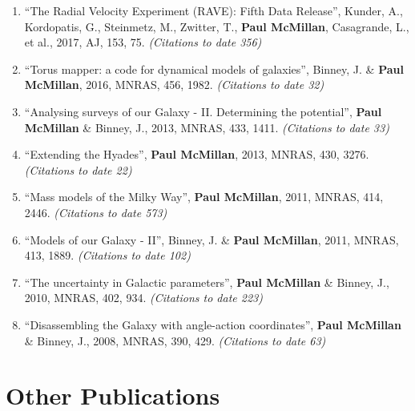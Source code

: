 \documentclass{resume}
\begin{document}
\begin{enumerate}
\item ``The Radial Velocity Experiment (RAVE): Fifth Data Release'', Kunder, A., Kordopatis, G., Steinmetz, M., Zwitter, T., \textbf{Paul McMillan}, Casagrande, L., et al., 2017, AJ, 153, 75. \textit{(Citations to date 356)}

\item ``Torus mapper: a code for dynamical models of galaxies'', Binney, J. \& \textbf{Paul McMillan}, 2016, MNRAS, 456, 1982. \textit{(Citations to date 32)}

\item ``Analysing surveys of our Galaxy - II. Determining the potential'', \textbf{Paul McMillan} \& Binney, J., 2013, MNRAS, 433, 1411. \textit{(Citations to date 33)}

\item ``Extending the Hyades'', \textbf{Paul McMillan}, 2013, MNRAS, 430, 3276. \textit{(Citations to date 22)}

\item ``Mass models of the Milky Way'', \textbf{Paul McMillan}, 2011, MNRAS, 414, 2446. \textit{(Citations to date 573)}

\item ``Models of our Galaxy - II'', Binney, J. \& \textbf{Paul McMillan}, 2011, MNRAS, 413, 1889. \textit{(Citations to date 102)}

\item ``The uncertainty in Galactic parameters'', \textbf{Paul McMillan} \& Binney, J., 2010, MNRAS, 402, 934. \textit{(Citations to date 223)}

\item ``Disassembling the Galaxy with angle-action coordinates'', \textbf{Paul McMillan} \& Binney, J., 2008, MNRAS, 390, 429. \textit{(Citations to date 63)}

\end{enumerate}\section*{Other Publications}
\end{document}
